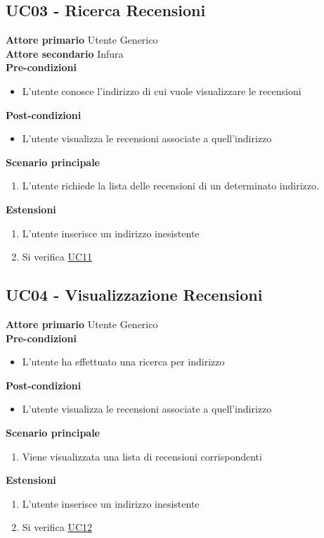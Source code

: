 \subsection{UC03 - Ricerca Recensioni}
\label{UC03}
\textbf{Attore primario} Utente Generico \\
\textbf{Attore secondario} Infura \\
\textbf{Pre-condizioni}
\begin{itemize}
    \item L'utente conosce l'indirizzo di cui vuole visualizzare le recensioni
\end{itemize}
\textbf{Post-condizioni}
\begin{itemize}
    \item L'utente visualizza le recensioni associate a quell'indirizzo
\end{itemize}
\textbf{Scenario principale}
\begin{enumerate}
    \item L'utente richiede la lista delle recensioni di un determinato indirizzo.
\end{enumerate}
\textbf{Estensioni}
\begin{enumerate}
    \item L'utente inserisce un indirizzo inesistente
    \item Si verifica \hyperref[UC11]{UC11}
\end{enumerate}

\subsection{UC04 - Visualizzazione Recensioni}
\label{UC04}
\textbf{Attore primario} Utente Generico \\
\textbf{Pre-condizioni}
\begin{itemize}
    \item L'utente ha effettuato una ricerca per indirizzo
\end{itemize}
\textbf{Post-condizioni}
\begin{itemize}
    \item L'utente visualizza le recensioni associate a quell'indirizzo
\end{itemize}
\textbf{Scenario principale}
\begin{enumerate}
    \item Viene visualizzata una lista di recensioni corrispondenti
\end{enumerate}
\textbf{Estensioni}
\begin{enumerate}
    \item L'utente inserisce un indirizzo inesistente
    \item Si verifica \hyperref[UC12]{UC12}
\end{enumerate}

